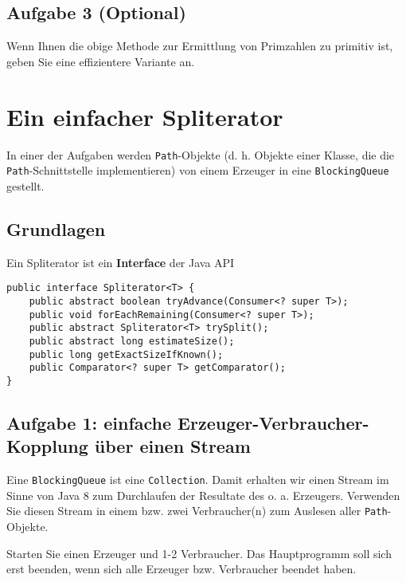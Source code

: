 \subsection{Aufgabe 3 (Optional)}\label{aufgabe-3-optional}

Wenn Ihnen die obige Methode zur Ermittlung von Primzahlen zu primitiv
ist, geben Sie eine effizientere Variante an.

\section{Ein einfacher Spliterator}\label{ein-einfacher-spliterator}

In einer der Aufgaben werden \texttt{Path}-Objekte (d. h.
Objekte einer Klasse, die die \texttt{Path}-Schnittstelle
implementieren) von einem Erzeuger in eine \texttt{BlockingQueue}
gestellt.

\subsection{Grundlagen}\label{grundlagen}

Ein Spliterator ist ein \textbf{Interface} der Java API

\begin{verbatim}
public interface Spliterator<T> {
    public abstract boolean tryAdvance(Consumer<? super T>);
    public void forEachRemaining(Consumer<? super T>);
    public abstract Spliterator<T> trySplit();
    public abstract long estimateSize();
    public long getExactSizeIfKnown();
    public Comparator<? super T> getComparator();
}
\end{verbatim}

\subsection{Aufgabe 1: einfache Erzeuger-Verbraucher-Kopplung über einen
Stream}\label{aufgabe-1-einfache-erzeuger-verbraucher-kopplung-uxfcber-einen-stream}

Eine \texttt{BlockingQueue} ist eine \texttt{Collection}. Damit erhalten
wir einen Stream im Sinne von Java 8 zum Durchlaufen der Resultate des
o. a. Erzeugers. Verwenden Sie diesen Stream in einem bzw. zwei
Verbraucher(n) zum Auslesen aller \texttt{Path}-Objekte.

Starten Sie einen Erzeuger und 1-2 Verbraucher. Das Hauptprogramm soll
sich erst beenden, wenn sich alle Erzeuger bzw. Verbraucher beendet
haben.

